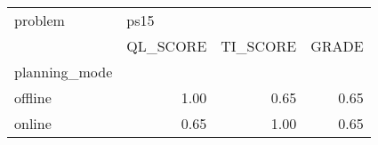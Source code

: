 \begin{tabular}{lrrr}
\toprule
problem & \multicolumn{3}{l}{ps15} \\
{} & QL\_SCORE & TI\_SCORE & GRADE \\
planning\_mode &          &          &       \\
\midrule
offline       &     1.00 &     0.65 &  0.65 \\
online        &     0.65 &     1.00 &  0.65 \\
\bottomrule
\end{tabular}
